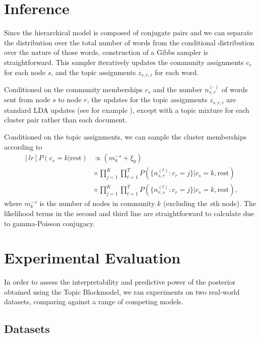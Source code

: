 \section{Inference}\label{sec:inference}

    Since the hierarchical model is composed of conjugate pairs and we can separate the distribution over the total number of words from the conditional distribution over the nature of those words, construction of a Gibbs sampler is straightforward. This sampler iteratively updates the community assignments $c_s$ for each node $s$, and the topic assignments $z_{s,r,i}$ for each word.
    
    Conditioned on the community memberships $c_s$ and the number $n_{s,r}^{(\cdot)}$ of words sent from node $s$ to node $r$,  the updates for the topic assignments $z_{s,r,i}$ are standard LDA updates (see for example \citep{griffiths2004finding}), except with a topic mixture for each cluster pair rather than each document. 
    
    Conditioned on the topic assignments, we can sample the cluster memberships according to
    \begin{equation}
    \begin{aligned}[l r] P(c_s=k|\mbox{rest}) & \propto (m_k^{-s}+\xi_0) \\ & \times \prod_{j=1}^K \prod_{t=1}^T P(\{n_{s,r}^{(t)}: c_r=j\}|c_s=k, \mbox{rest}) \\ & \times \prod_{j=1}^K \prod_{t=1}^T  P(\{n_{r,s}^{(t)}:c_r=j\}|c_s=k, \mbox{rest}), \end{aligned}
    \end{equation}
    where $m_k^{-s}$ is the number of nodes in community $k$ (excluding the $s$th node). The likelihood terms in the second and third line are straightforward to calculate due to gamma-Poisson conjugacy. 

\section{Experimental Evaluation}\label{sec:results}

    In order to assess the interpretability and predictive power of the posterior obtained using the Topic Blockmodel, we ran experiments on two real-world datasets, comparing against a range of competing models. 
    
    \subsection{Datasets}\label{sec:datasets}
    
